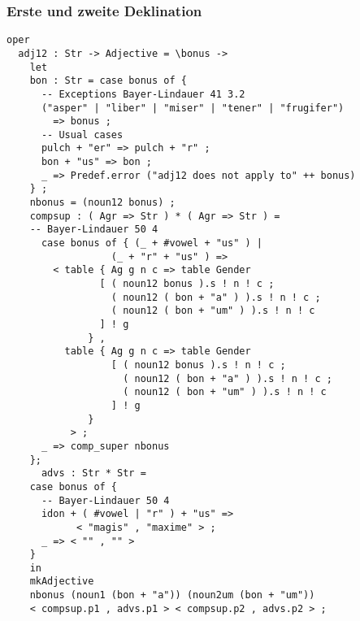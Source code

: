 \subsubsection{Erste und zweite Deklination}
\begin{lstlisting}[float=h!tp,caption={Deklinationsfunktion für drei-endige Adjektive der ersten und zweiten Deklination (vgl. \textbf{MorphoLat.gf})},label={GF-Morpho-Adj12},basicstyle=\small]
oper
  adj12 : Str -> Adjective = \bonus ->
    let
    bon : Str = case bonus of {
      -- Exceptions Bayer-Lindauer 41 3.2
      ("asper" | "liber" | "miser" | "tener" | "frugifer") 
        => bonus ;
      -- Usual cases
      pulch + "er" => pulch + "r" ;
      bon + "us" => bon ;
      _ => Predef.error ("adj12 does not apply to" ++ bonus)
	} ; 
    nbonus = (noun12 bonus) ;
    compsup : ( Agr => Str ) * ( Agr => Str ) = 
	-- Bayer-Lindauer 50 4
      case bonus of { (_ + #vowel + "us" ) |
	              (_ + "r" + "us" ) => 
	    < table { Ag g n c => table Gender 
                [ ( noun12 bonus ).s ! n ! c ; 
                  ( noun12 ( bon + "a" ) ).s ! n ! c ; 
                  ( noun12 ( bon + "um" ) ).s ! n ! c 
                ] ! g 
              } ,
	      table { Ag g n c => table Gender 
                  [ ( noun12 bonus ).s ! n ! c ; 
                    ( noun12 ( bon + "a" ) ).s ! n ! c ; 
                    ( noun12 ( bon + "um" ) ).s ! n ! c 
                  ] ! g 
              } 
           > ;
	  _ => comp_super nbonus
	};
      advs : Str * Str = 
	case bonus of {
	  -- Bayer-Lindauer 50 4
	  idon + ( #vowel | "r" ) + "us" => 
            < "magis" , "maxime" > ;
	  _ => < "" , "" >
	}
    in
    mkAdjective 
    nbonus (noun1 (bon + "a")) (noun2um (bon + "um"))
    < compsup.p1 , advs.p1 > < compsup.p2 , advs.p2 > ;
\end{lstlisting}
